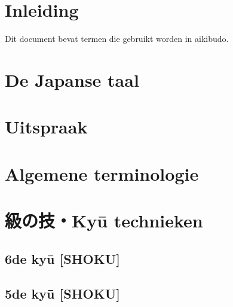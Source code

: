 \documentclass[a4paper, 12pt]{article}
\begin{document}




\newpage


\newpage
\setcounter{page}{1}
\tableofcontents

\newpage
\setcounter{page}{1}

\section{Inleiding}
\noindent Dit document bevat termen die gebruikt worden in aikibudo.

\section{De Japanse taal}


\section{Uitspraak}


\section{Algemene terminologie}


\newpage
\section{級の技・Ky\={u} technieken}
\subsection{6de ky\={u} [SHOKU]}


\newpage
\subsection{5de ky\={u} [SHOKU]}

\end{document}
